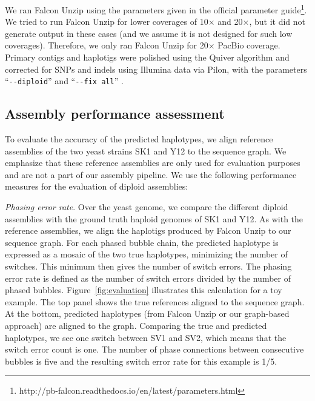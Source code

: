 We ran Falcon Unzip using the parameters given in the official parameter guide\footnote{http://pb-falcon.readthedocs.io/en/latest/parameters.html}.
We tried to run Falcon Unzip for lower coverages of 10$\times$ and 20$\times$, but it did not generate output in these cases (and we assume it is not designed for such low coverages).
Therefore, we only ran Falcon Unzip for 20$\times$ PacBio coverage.
Primary contigs and haplotigs were polished using the Quiver algorithm and corrected for SNPs and indels using Illumina data via Pilon, with the parameters ``\texttt{{-}{-}diploid}'' and ``\texttt{{-}{-}fix all}'' \citep{walker2014pilon}.

\subsection{Assembly performance assessment}
To evaluate the accuracy of the predicted haplotypes, we align reference assemblies of the two yeast strains SK1 and Y12 \citep{yue2017contrasting} to the sequence graph.
We emphasize that these reference assemblies are only used for evaluation purposes and are not a part of our assembly pipeline.
We use the following performance measures for the evaluation of diploid assemblies:

\textit{Phasing error rate}. Over the yeast genome, we compare the different diploid assemblies with the ground truth haploid genomes of SK1 and Y12.
As with the reference assemblies, we align the haplotigs produced by Falcon Unzip to our sequence graph.
For each phased bubble chain, the predicted haplotype is expressed as a mosaic of the two true haplotypes, minimizing the number of switches. 
This minimum then gives the number of switch errors.
The phasing error rate is defined as the number of switch errors divided by the number of phased bubbles.
Figure~\ref{fig:evaluation} illustrates this calculation for a toy example.  The top panel shows the true references aligned to the sequence graph. At the bottom, predicted haplotypes (from Falcon Unzip or our graph-based approach) are aligned to the graph.
Comparing the true and predicted haplotypes, we see one switch between SV1 and SV2, which means that the switch error count is one. 
The number of phase connections between consecutive bubbles is five and the resulting switch error rate for this example is 1/5.

